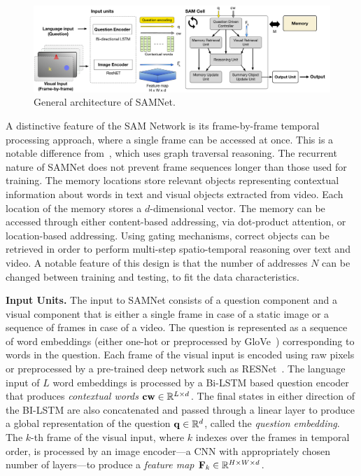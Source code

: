 \begin{figure}
	\centering
	\includegraphics[width=\textwidth]{../img/architecture/SAMNETmodel}
	\caption{General architecture of SAMNet.}
	\label{fig:samnet}\vspace{-10pt}
\end{figure}

A distinctive feature of the SAM Network is its frame-by-frame temporal processing approach, where a single frame can be accessed at once. This is a notable difference from~\cite{haurilet2019s}, which uses graph traversal reasoning. The recurrent nature of SAMNet does not prevent frame sequences longer than those used for training.
The memory locations store relevant objects representing contextual information about words in text and visual objects extracted from video.
Each location of the memory stores a $d$-dimensional vector. %
The memory can be accessed through either content-based addressing, via dot-product attention, or location-based addressing. Using gating mechanisms, correct objects can be retrieved in order to perform multi-step spatio-temporal reasoning over text and video.
A notable feature of this design is that the number of addresses $N$ can be changed between training and testing, to fit the data characteristics.


\smallskip

\noindent\textbf{Input Units.}
The input to SAMNet consists of a question component and a visual component that is either a single frame in case of a static image or a sequence of frames in case of a video.
The question is represented as a sequence of word embeddings (either one-hot or preprocessed by GloVe~\cite{pennington2014glove}) corresponding to words in the question.
Each frame of the visual input is encoded using raw pixels or preprocessed by a pre-trained deep network such as RESNet~\cite{he2016deep}.
The language input of $L$ word embeddings is processed by a Bi-LSTM based question encoder that produces \emph{contextual words} $\mathbf{cw} \in \mathbb{R}^{L \times d}$.
The final states in either direction of the BI-LSTM are also concatenated and passed through a linear layer to produce a global representation of the question 
$\mathbf{q} \in \mathbb{R}^d$, called the \emph{question embedding}.
The $k$-th frame of the visual input, where $k$ indexes over the frames in temporal order, is processed by an image encoder---a CNN with appropriately chosen number of layers---to produce a \emph{feature map} 
$\mathbf{F}_k \in \mathbb{R}^{H \times W \times d}$.

